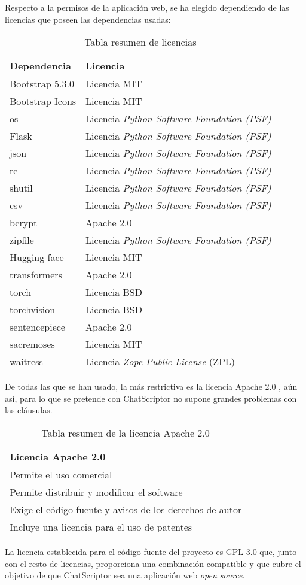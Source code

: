 Respecto a la permisos de la aplicación web, se ha elegido dependiendo de las licencias que poseen las dependencias usadas:

\begin{table}[H]
\centering
\begin{tabular}{ll}
\toprule
Dependencia & Licencia \\
\midrule
Bootstrap 5.3.0 & Licencia MIT \\
Bootstrap Icons & Licencia MIT \\
os & Licencia \textit{Python Software Foundation (PSF)} \\
Flask & Licencia \textit{Python Software Foundation (PSF)} \\
json & Licencia \textit{Python Software Foundation (PSF)} \\
re & Licencia \textit{Python Software Foundation (PSF)} \\
shutil & Licencia \textit{Python Software Foundation (PSF)} \\
csv & Licencia \textit{Python Software Foundation (PSF)} \\
bcrypt & Apache 2.0 \\
zipfile & Licencia \textit{Python Software Foundation (PSF)} \\
Hugging face & Licencia MIT \\
transformers & Apache 2.0 \\
torch & Licencia BSD \\
torchvision & Licencia BSD \\
sentencepiece & Apache 2.0 \\
sacremoses & Licencia MIT \\
waitress & Licencia \textit{Zope Public License} (ZPL) \\
\bottomrule
\end{tabular}
\caption{Tabla resumen de licencias}
\end{table}

De todas las que se han usado, la más restrictiva es la licencia Apache 2.0 \cite{ApacheLi88:online}, aún así, para lo que se pretende con ChatScriptor no supone grandes problemas con las cláusulas.

\begin{table}[H]
\centering
\begin{tabular}{l}
\toprule
Licencia Apache 2.0 \\
\midrule
Permite el uso comercial \\
Permite distribuir y modificar el software \\
Exige el código fuente y avisos de los derechos de autor \\
Incluye una licencia para el uso de patentes  \\
\bottomrule
\end{tabular}
\caption{Tabla resumen de la licencia Apache 2.0}
\end{table}

La licencia establecida para el código fuente del proyecto es GPL-3.0 que, junto con el resto de licencias, proporciona una combinación compatible y que cubre el objetivo de que ChatScriptor sea una aplicación web \textit{open source}.
